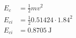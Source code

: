\documentclass{standalone}
\begin{document}
    \(\begin{aligned}
        E_c &= \frac{1}{2}mv^2\\
        E_{ci} &= \frac{1}{2} 0.51424 \cdot 1.84^2\\
        E_{ci} &= \SI{0.8705}{\joule}
    \end{aligned}\)\\
\end{document}
